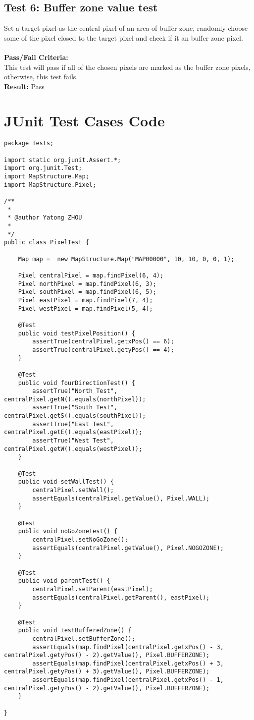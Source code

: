 \documentclass[11pt, a4paper]{report}
\begin{document}
\subsection {Test 6: Buffer zone value test}
Set a target pixel as the central pixel of an area of buffer zone, randomly choose some of the pixel closed to the target pixel and check if it an buffer zone pixel.\\\\
\noindent\textbf{Pass/Fail Criteria:\\}
This test will pass if all of the chosen pixels are marked as the buffer zone pixels, otherwise, this test fails.\\

\noindent\textbf{Result: }Pass
\pagebreak

\section{JUnit Test Cases Code}


\begin{lstlisting} 
package Tests;

import static org.junit.Assert.*;
import org.junit.Test;
import MapStructure.Map;
import MapStructure.Pixel;

/**
 * 
 * @author Yatong ZHOU
 *
 */
public class PixelTest {
	
	Map map =  new MapStructure.Map("MAP00000", 10, 10, 0, 0, 1);
	
	Pixel centralPixel = map.findPixel(6, 4);
	Pixel northPixel = map.findPixel(6, 3);
	Pixel southPixel = map.findPixel(6, 5);
	Pixel eastPixel = map.findPixel(7, 4);
	Pixel westPixel = map.findPixel(5, 4);
	
	@Test
	public void testPixelPosition() {
		assertTrue(centralPixel.getxPos() == 6);
		assertTrue(centralPixel.getyPos() == 4);
	}
	
	@Test
	public void fourDirectionTest() {
		assertTrue("North Test", centralPixel.getN().equals(northPixel));
		assertTrue("South Test", centralPixel.getS().equals(southPixel));
		assertTrue("East Test", centralPixel.getE().equals(eastPixel));
		assertTrue("West Test", centralPixel.getW().equals(westPixel));
	}
	
	@Test
	public void setWallTest() {
		centralPixel.setWall();
		assertEquals(centralPixel.getValue(), Pixel.WALL);
	}
	
	@Test
	public void noGoZoneTest() {
		centralPixel.setNoGoZone();
		assertEquals(centralPixel.getValue(), Pixel.NOGOZONE);
	}
	
	@Test
	public void parentTest() {
		centralPixel.setParent(eastPixel);
		assertEquals(centralPixel.getParent(), eastPixel);
	}
	
	@Test
	public void testBufferedZone() {
		centralPixel.setBufferZone();
		assertEquals(map.findPixel(centralPixel.getxPos() - 3, centralPixel.getyPos() - 2).getValue(), Pixel.BUFFERZONE);
		assertEquals(map.findPixel(centralPixel.getxPos() + 3, centralPixel.getyPos() + 3).getValue(), Pixel.BUFFERZONE);
		assertEquals(map.findPixel(centralPixel.getxPos() - 1, centralPixel.getyPos() - 2).getValue(), Pixel.BUFFERZONE);
	}
	
}
\end{lstlisting} 
\end{document}
